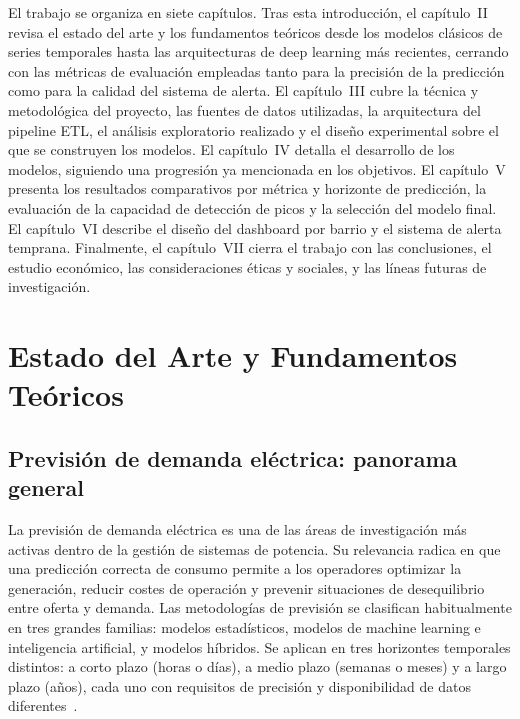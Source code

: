 \documentclass[12pt, a4paper]{article}
\begin{document}
El  trabajo se organiza en siete capítulos. Tras esta introducción, el capítulo~II revisa el estado del arte y los fundamentos teóricos desde los modelos clásicos de series temporales hasta las arquitecturas de deep learning más recientes, cerrando con las métricas de evaluación empleadas tanto para la precisión de la predicción como para la calidad del sistema de alerta. El capítulo~III cubre la  técnica y metodológica del proyecto, las fuentes de datos utilizadas, la arquitectura del pipeline ETL, el análisis exploratorio realizado y el diseño experimental sobre el que se construyen los modelos. El capítulo~IV detalla el desarrollo de los modelos, siguiendo una progresión ya mencionada en los objetivos. El capítulo~V presenta los resultados comparativos por métrica y horizonte de predicción, la evaluación de la capacidad de detección de picos y la selección del modelo final. El capítulo~VI describe el diseño del dashboard por barrio y el sistema de alerta temprana. Finalmente, el capítulo~VII cierra el trabajo con las conclusiones, el estudio económico, las consideraciones éticas y sociales, y las líneas futuras de investigación.

\section{Estado del Arte y Fundamentos Teóricos}

\subsection{Previsión de demanda eléctrica: panorama general}

La previsión de demanda eléctrica es una de las áreas de investigación más activas dentro de la gestión de sistemas de potencia. Su relevancia radica en que una predicción correcta de consumo permite a los operadores optimizar la generación, reducir costes de operación y prevenir situaciones de desequilibrio entre oferta y demanda. Las metodologías de previsión se clasifican habitualmente en tres grandes familias: modelos estadísticos, modelos de machine learning e inteligencia artificial, y modelos híbridos. Se aplican en tres horizontes temporales distintos: a corto plazo (horas o días), a medio plazo (semanas o meses) y a largo plazo (años), cada uno con requisitos de precisión y disponibilidad de datos diferentes~\cite{ugbehe2025}.
\end{document}
